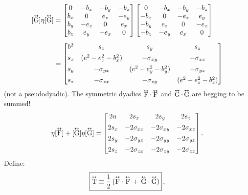 \documentclass[12pt]{article}
\newcommand{\tightoverset}[2]{%
  \mathop{#2}\limits^{\vbox to -.5ex{\kern-0.75ex\hbox{$#1$}\vss}}}
\newcommand{\inlinedy}[1]{\tightoverset{\text{\tiny$\bm\leftrightarrow$}}{#1}}
\newcommand{\capdy}[1]{ \overset{ \text{\tiny$\bm\leftrightarrow$} }{\vphantom{\text{\small{A}}}\smash{#1}} }
\begin{document}
\begin{equation*}
\begin{aligned}
\mkern0mu [\capdy{\mathrm{G}}] \eta [\capdy{\mathrm{G}}]
&=
\begin{bmatrix}
0 & -b_x & -b_y & -b_z \\
b_x & 0 & e_z & -e_y \\
b_y & -e_z & 0 & e_x \\
b_z & e_y & -e_x & 0
\end{bmatrix}
\begin{bmatrix}
0 & -b_x & -b_y & -b_z \\
-b_x & 0 & -e_z & e_y \\
-b_y & e_z & 0 & -e_x \\
-b_z & -e_y & e_x & 0
\end{bmatrix} \\[5pt]
&=
\begin{bmatrix}
b^2 & s_x & s_y & s_z \\[1ex]
s_x & (e^2 - e_x^2 - b_x^2) & - \sigma_{x y} & - \sigma_{x z} \\[1ex]
s_y & - \sigma_{y x} & (e^2 - e_y^2 - b_y^2)  & - \sigma_{y z} \\[1ex]
s_z & - \sigma_{z x} & - \sigma_{z y} & (e^2 - e_z^2 - b_z^2) 
\end{bmatrix}
\end{aligned}
\end{equation*}
(not a pseudodyadic). The symmetric dyadics $\inlinedy{\mathrm{F}} \cdot \inlinedy{\mathrm{F}}$ and $\inlinedy{\mathrm{G}} \cdot \inlinedy{\mathrm{G}}$ are begging to be summed!
\begin{equation*}
[\capdy{\mathrm{F}}] \eta [\capdy{\mathrm{F}}] + [\capdy{\mathrm{G}}] \eta [\capdy{\mathrm{G}}]
=
\begin{bmatrix}
2 u & 2 s_x & 2 s_y & 2 s_z \\[1ex]
2 s_x & - 2 \sigma_{x x} & - 2 \sigma_{x y} & - 2 \sigma_{x z} \\[1ex]
2 s_y & - 2 \sigma_{y x} & - 2 \sigma_{yy}  & - 2 \sigma_{y z} \\[1ex]
2 s_z & - 2 \sigma_{z x} & - 2 \sigma_{z y} & - 2 \sigma_{zz}
\end{bmatrix}.
\end{equation*}
Define:
\begin{equation}\label{eq:eset}
\boxed { \capdy{\mathrm{T}} \equiv \dfrac{1}{2} \, ( \capdy{\mathrm{F}} \cdot \capdy{\mathrm{F}} \, + \, \capdy{\mathrm{G}} \cdot \capdy{\mathrm{G}} ) } \, ,
\end{equation}
\end{document}
